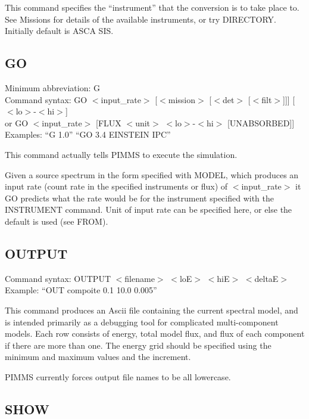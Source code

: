 This command specifies the  ``instrument''  that the conversion is to take place
to.   See Missions for details of the available instruments, or try DIRECTORY.
Initially default is ASCA SIS.

\subsection*{GO}

Minimum abbreviation: G \\
Command syntax: GO $<$input\_rate$>$ [$<$mission$>$ [$<$det$>$ [$<$filt$>$]]] [$<$lo$>$-$<$hi$>$] \\
\hspace{1.5 cm} or GO $<$input\_rate$>$ [FLUX $<$unit$>$ $<$lo$>$-$<$hi$>$ [UNABSORBED]] \\
Examples: ``G 1.0'' ``GO 3.4 EINSTEIN IPC'' \\
\vspace{0.5 cm}

This command actually tells PIMMS to execute the simulation.

Given a source spectrum in the form specified with MODEL,  which produces an
input rate (count rate in the specified instruments or flux) of $<$input\_rate$>$
it GO predicts what the rate  would be for the instrument specified with the
INSTRUMENT command.   Unit of input rate can be specified here,  or else the
default is used (see FROM).

\subsection*{OUTPUT}

Command syntax: OUTPUT $<$filename$>$ $<$loE$>$ $<$hiE$>$ $<$deltaE$>$ \\
Example: ``OUT compoite 0.1 10.0 0.005'' \\
\vspace{0.5 cm}

This command produces an Ascii file containing the current spectral model,
and is intended primarily as a debugging tool for complicated multi-component
models.  Each row consists of energy, total model flux, and flux of each
component if there are more than one.  The energy grid should be specified
using the minimum and maximum values and the increment.

PIMMS currently forces output file names to be all lowercase.

\subsection*{SHOW}

